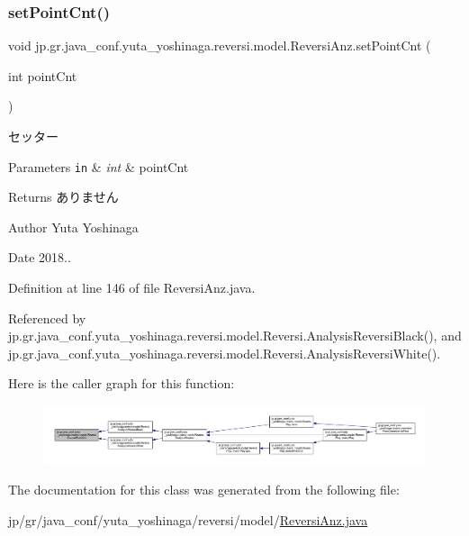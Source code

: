\subsubsection{\texorpdfstring{set\+Point\+Cnt()}{setPointCnt()}}
{\footnotesize\ttfamily void jp.\+gr.\+java\+\_\+conf.\+yuta\+\_\+yoshinaga.\+reversi.\+model.\+Reversi\+Anz.\+set\+Point\+Cnt (\begin{DoxyParamCaption}\item[{int}]{point\+Cnt }\end{DoxyParamCaption})}



セッター 


\begin{DoxyParams}[1]{Parameters}
\mbox{\tt in}  & {\em int} & point\+Cnt \\
\hline
\end{DoxyParams}
\begin{DoxyReturn}{Returns}
ありません 
\end{DoxyReturn}
\begin{DoxyAuthor}{Author}
Yuta Yoshinaga 
\end{DoxyAuthor}
\begin{DoxyDate}{Date}
2018.. 
\end{DoxyDate}


Definition at line 146 of file Reversi\+Anz.\+java.



Referenced by jp.\+gr.\+java\+\_\+conf.\+yuta\+\_\+yoshinaga.\+reversi.\+model.\+Reversi.\+Analysis\+Reversi\+Black(), and jp.\+gr.\+java\+\_\+conf.\+yuta\+\_\+yoshinaga.\+reversi.\+model.\+Reversi.\+Analysis\+Reversi\+White().

Here is the caller graph for this function\+:
\nopagebreak
\begin{figure}[H]
\begin{center}
\leavevmode
\includegraphics[width=350pt]{classjp_1_1gr_1_1java__conf_1_1yuta__yoshinaga_1_1reversi_1_1model_1_1_reversi_anz_ad57c26b0d7851a3c9e1b1ad328f2f0be_icgraph}
\end{center}
\end{figure}


The documentation for this class was generated from the following file\+:\begin{DoxyCompactItemize}
\item 
jp/gr/java\+\_\+conf/yuta\+\_\+yoshinaga/reversi/model/\hyperlink{_reversi_anz_8java}{Reversi\+Anz.\+java}\end{DoxyCompactItemize}
